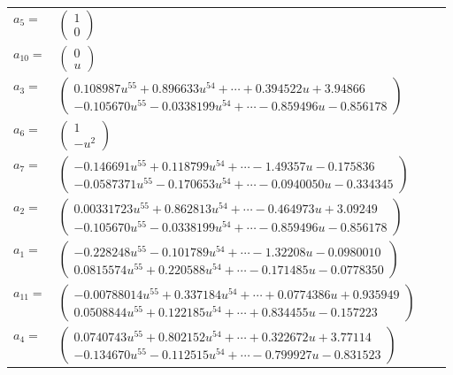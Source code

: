 \documentclass[1p]{elsarticle_modified}
\theoremstyle{definition}
\begin{document}
\begin{tabular}{m{7pt} m{180pt} m{7pt} m{180pt} }
\flushright $a_{5}=$&$\begin{pmatrix}1\\0\end{pmatrix}$ \\
\flushright $a_{10}=$&$\begin{pmatrix}0\\u\end{pmatrix}$ \\
\flushright $a_{3}=$&$\begin{pmatrix}0.108987 u^{55}+0.896633 u^{54}+\cdots+0.394522 u+3.94866\\-0.105670 u^{55}-0.0338199 u^{54}+\cdots-0.859496 u-0.856178\end{pmatrix}$ \\
\flushright $a_{6}=$&$\begin{pmatrix}1\\- u^2\end{pmatrix}$ \\
\flushright $a_{7}=$&$\begin{pmatrix}-0.146691 u^{55}+0.118799 u^{54}+\cdots-1.49357 u-0.175836\\-0.0587371 u^{55}-0.170653 u^{54}+\cdots-0.0940050 u-0.334345\end{pmatrix}$ \\
\flushright $a_{2}=$&$\begin{pmatrix}0.00331723 u^{55}+0.862813 u^{54}+\cdots-0.464973 u+3.09249\\-0.105670 u^{55}-0.0338199 u^{54}+\cdots-0.859496 u-0.856178\end{pmatrix}$ \\
\flushright $a_{1}=$&$\begin{pmatrix}-0.228248 u^{55}-0.101789 u^{54}+\cdots-1.32208 u-0.0980010\\0.0815574 u^{55}+0.220588 u^{54}+\cdots-0.171485 u-0.0778350\end{pmatrix}$ \\
\flushright $a_{11}=$&$\begin{pmatrix}-0.00788014 u^{55}+0.337184 u^{54}+\cdots+0.0774386 u+0.935949\\0.0508844 u^{55}+0.122185 u^{54}+\cdots+0.834455 u-0.157223\end{pmatrix}$ \\
\flushright $a_{4}=$&$\begin{pmatrix}0.0740743 u^{55}+0.802152 u^{54}+\cdots+0.322672 u+3.77114\\-0.134670 u^{55}-0.112515 u^{54}+\cdots-0.799927 u-0.831523\end{pmatrix}$ \\

\end{tabular}
\end{document}
